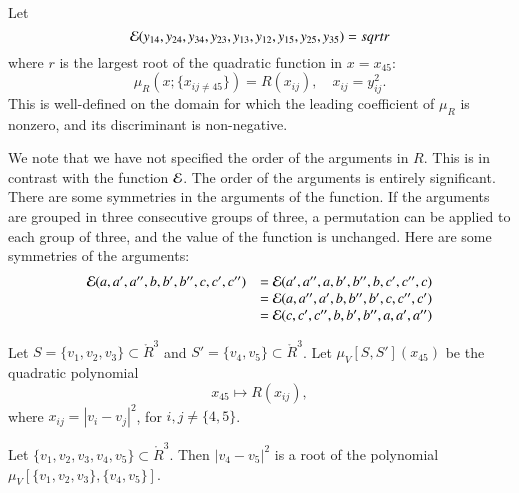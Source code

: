 \begin{tarskidata}
\begin{tarski}
\begin{definition}[$\CalE$] 
Let 
$${\mathcal E}(y_{14},y_{24},y_{34},y_{23},y_{13},y_{12},y_{15},y_{25},y_{35})=sqrt{r}$$
where $r$ is the largest root of the quadratic function in $x=x_{45}$:
	$$
	\mu_R(x;\{x_{ij\ne45}\} )=R(x_{ij}),\quad x_{ij} = y_{ij}^2.
	$$
This is well-defined on the domain for which the leading coefficient of $\mu_R$ is nonzero, and its
discriminant is non-negative.  
\end{definition}
We note that we have not specified the order of the arguments in $R$.   This is in
contrast with the function $\CalE$.  The order of the arguments is entirely significant.
There are some symmetries in the
arguments of the function.  
If the arguments are grouped in three consecutive groups of three, a permutation
can be applied to each group of three, and the value of the function is unchanged.  Here
are some symmetries of the arguments:
	$$
	\begin{array}{lll}
	{\mathcal E}(a,a',a'',b,b',b'',c,c',c'') &= {\mathcal E}(a',a'',a,b',b'',b,c',c'',c)\\
			&={\mathcal E}(a,a'',a',b,b'',b',c,c'',c')\\
			&= {\mathcal E}(c,c',c'',b,b',b'',a,a',a'')\\
	\end{array}
	$$
\end{tarski}


\begin{tarski}

\begin{definition}[$\mu_V$]
Let $S=\{v_1,v_2,v_3\}\subset\ring{R}^3$ and $S'=\{v_4,v_5\}\subset\ring{R}^3$.
Let $\mu_V[S,S'](x_{45})$ be the quadratic polynomial 
   $$x_{45}\mapsto R(x_{ij}),$$
where $x_{ij} = |v_i-v_j|^2$, for ${i,j}\ne \{4,5\}$.  
\end{definition}
\end{tarski}



\begin{tarski}

\begin{lemma}
Let $\{v_1,v_2,v_3,v_4,v_5\}\subset\ring{R}^3$.
Then $|v_4-v_5|^2$ is a root of the polynomial 
$\mu_V[\{v_1,v_2,v_3\},\{v_4,v_5\}]$. 
\end{lemma}


\end{tarski}
\end{tarskidata}
